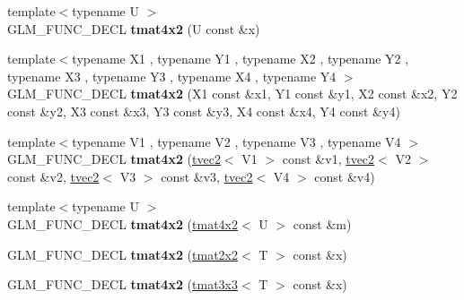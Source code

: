 \begin{DoxyCompactItemize}
\item 
\hypertarget{structglm_1_1detail_1_1tmat4x2_a8be40d60e581c88ab765a18c71090c63}{{\footnotesize template$<$typename U $>$ }\\G\-L\-M\-\_\-\-F\-U\-N\-C\-\_\-\-D\-E\-C\-L {\bfseries tmat4x2} (U const \&x)}\label{structglm_1_1detail_1_1tmat4x2_a8be40d60e581c88ab765a18c71090c63}

\item 
\hypertarget{structglm_1_1detail_1_1tmat4x2_ade64c9393252ddc8618f573c792db3ee}{{\footnotesize template$<$typename X1 , typename Y1 , typename X2 , typename Y2 , typename X3 , typename Y3 , typename X4 , typename Y4 $>$ }\\G\-L\-M\-\_\-\-F\-U\-N\-C\-\_\-\-D\-E\-C\-L {\bfseries tmat4x2} (X1 const \&x1, Y1 const \&y1, X2 const \&x2, Y2 const \&y2, X3 const \&x3, Y3 const \&y3, X4 const \&x4, Y4 const \&y4)}\label{structglm_1_1detail_1_1tmat4x2_ade64c9393252ddc8618f573c792db3ee}

\item 
\hypertarget{structglm_1_1detail_1_1tmat4x2_abd440da80430ebbf6926802de5677d2c}{{\footnotesize template$<$typename V1 , typename V2 , typename V3 , typename V4 $>$ }\\G\-L\-M\-\_\-\-F\-U\-N\-C\-\_\-\-D\-E\-C\-L {\bfseries tmat4x2} (\hyperlink{structglm_1_1detail_1_1tvec2}{tvec2}$<$ V1 $>$ const \&v1, \hyperlink{structglm_1_1detail_1_1tvec2}{tvec2}$<$ V2 $>$ const \&v2, \hyperlink{structglm_1_1detail_1_1tvec2}{tvec2}$<$ V3 $>$ const \&v3, \hyperlink{structglm_1_1detail_1_1tvec2}{tvec2}$<$ V4 $>$ const \&v4)}\label{structglm_1_1detail_1_1tmat4x2_abd440da80430ebbf6926802de5677d2c}

\item 
\hypertarget{structglm_1_1detail_1_1tmat4x2_a8bb7a37fd0a87da404f480b577405bc6}{{\footnotesize template$<$typename U $>$ }\\G\-L\-M\-\_\-\-F\-U\-N\-C\-\_\-\-D\-E\-C\-L {\bfseries tmat4x2} (\hyperlink{structglm_1_1detail_1_1tmat4x2}{tmat4x2}$<$ U $>$ const \&m)}\label{structglm_1_1detail_1_1tmat4x2_a8bb7a37fd0a87da404f480b577405bc6}

\item 
\hypertarget{structglm_1_1detail_1_1tmat4x2_a543de5cbaad18d435b26979899368666}{G\-L\-M\-\_\-\-F\-U\-N\-C\-\_\-\-D\-E\-C\-L {\bfseries tmat4x2} (\hyperlink{structglm_1_1detail_1_1tmat2x2}{tmat2x2}$<$ T $>$ const \&x)}\label{structglm_1_1detail_1_1tmat4x2_a543de5cbaad18d435b26979899368666}

\item 
\hypertarget{structglm_1_1detail_1_1tmat4x2_aa055e839b42a2111c526fcc48f741097}{G\-L\-M\-\_\-\-F\-U\-N\-C\-\_\-\-D\-E\-C\-L {\bfseries tmat4x2} (\hyperlink{structglm_1_1detail_1_1tmat3x3}{tmat3x3}$<$ T $>$ const \&x)}\label{structglm_1_1detail_1_1tmat4x2_aa055e839b42a2111c526fcc48f741097}


\end{DoxyCompactItemize}
